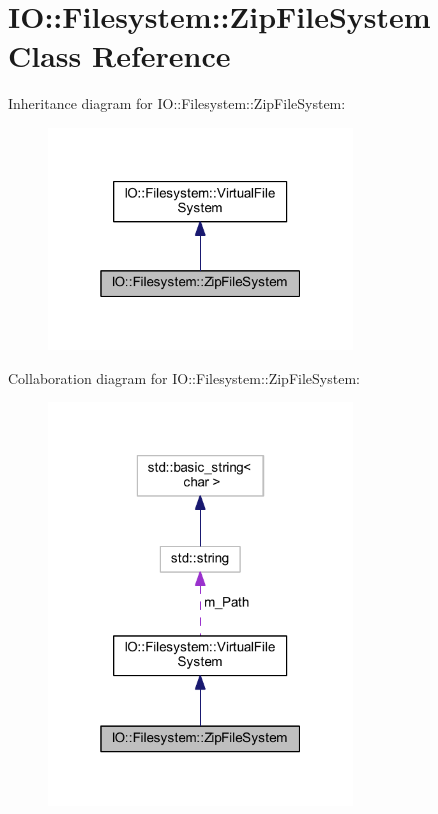 \hypertarget{class_i_o_1_1_filesystem_1_1_zip_file_system}{}\section{IO\+:\+:Filesystem\+:\+:Zip\+File\+System Class Reference}
\label{class_i_o_1_1_filesystem_1_1_zip_file_system}


Inheritance diagram for IO\+:\+:Filesystem\+:\+:Zip\+File\+System\+:
\nopagebreak
\begin{figure}[H]
\begin{center}
\leavevmode
\includegraphics[width=229pt]{class_i_o_1_1_filesystem_1_1_zip_file_system__inherit__graph}
\end{center}
\end{figure}


Collaboration diagram for IO\+:\+:Filesystem\+:\+:Zip\+File\+System\+:
\nopagebreak
\begin{figure}[H]
\begin{center}
\leavevmode
\includegraphics[width=229pt]{class_i_o_1_1_filesystem_1_1_zip_file_system__coll__graph}
\end{center}
\end{figure}
